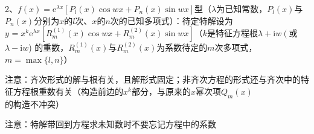 2、$f(x)=\mathrm{e}^{\lambda x}\left[P_{l}(x) \cos w x+P_{n}(x) \sin w x\right]$型（$\lambda$为已知常数，$P_{l}(x)$与$P_{n}(x)$分别为$x$的$l$次、$x$的$n$次的已知多项式）：待定特解设为$y^{}=x^{k} \mathrm{e}^{\lambda x}\left[R_{m}^{(1)}(x) \cos w x+R_{m}^{(2)}(x) \sin w x\right]$（$k$是特征方程根$\lambda+\mathrm{i} w\left(\right.$或$\lambda-\mathrm{i} w$) 的重数，$R_{m}^{(1)}(x)$与$R_{m}^{(2)}(x)$为系数待定的$m$次多项式，$m=\max \{l, n\}$）

注意：齐次形式的解与根有关，且解形式固定；非齐次方程的形式还与齐次中的特征方程根重数有关（构造前边的$x^{k}$部分，与原来的$x$幂次项$Q_{m}(x)$的构造不冲突）

注意：特解带回到方程求未知数时不要忘记方程中的系数

